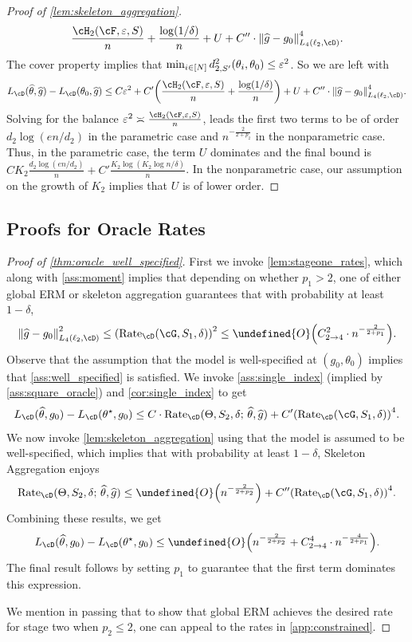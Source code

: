 \documentclass[11pt]{article} %
\newcommand{\pref}[1]{\cref{#1}}
\newcommand{\pfref}[1]{Proof of \pref{#1}}
\theoremstyle{theorem}  %
\theoremstyle{plain}
\DeclarePairedDelimiter{\brk}{[}{]}
\DeclarePairedDelimiter{\prn}{(}{)}
\DeclarePairedDelimiter{\nrm}{\|}{\|}
\newcommand{\ls}{\ell}
\newcommand{\veps}{\varepsilon}
\newcommand{\wt}[1]{\widetilde{#1}}
\newcommand{\wh}[1]{\widehat{#1}}
\let\wt\undefined
\newcommand{\wt}[1]{\widetilde{#1}}
\newcommand{\Ot}{\wt{O}}
\newcommand{\midsem}{;\,}
\newcommand{\poprisk}{L_{\cD}}
\newcommand{\estone}{\wh{g}}
\newcommand{\esttwo}{\wh{\theta}}
\newcommand{\pone}{p_1}
\newcommand{\ptwo}{p_2}
\newcommand{\dtwo}{d_2}
\newcommand{\nuisance}{\cG}
\newcommand{\target}{\Theta}
\newcommand{\dimtwo}{K_2}
\newcommand{\Rate}{\mathrm{Rate}_{\cD}}
\newcommand{\besttwo}{\theta^{\star}}
\newcommand{\gtone}{g_0}
\newcommand{\gttwo}{\theta_0}
\newcommand{\sampleone}{S_1}
\newcommand{\sampletwo}{S_2}
\newcommand{\momentconstant}{C_{2\to{}4}}
\begin{document}
\begin{proof}[\pfref{lem:skeleton_aggregation}]
\begin{align*}
{\frac{\cH_2(\cF,\veps,S)}{n}+ \frac{\log(1/\delta)}{n}
} + U + C''\cdot\nrm*{\estone-\gtone}_{L_4(\ls_2,\cD)}^{4}.
\end{align*}
The cover property implies that $\min_{i\in\brk*{N}}d_{2,S'}^{2}(\theta_i,\gttwo) \leq{} \veps^{2}$. So we are left with
\[
\poprisk(\esttwo,\estone) - \poprisk(\gttwo,\estone) \leq{}C\veps^{2} + C'\prn*{
\frac{\cH_2(\cF,\veps,S)}{n} + \frac{\log(1/\delta)}{n}
} + U + C''\cdot\nrm*{\estone-\gtone}_{L_4(\ls_2,\cD)}^{4}.
\]
%
Solving for the balance $\veps^{2}\asymp\frac{\cH_2(\cF,\veps,S)}{n}$, leads the first two terms to be of order $\dtwo\log(en/\dtwo)$ in the parametric case and $n^{-\frac{2}{2+\ptwo}}$ in the nonparametric case. Thus, in the parametric case, the term $U$ dominates and the final bound is $C\dimtwo{}\frac{\dtwo\log(en/\dtwo)}{n} + C'\frac{\dimtwo\log(\dimtwo\log{}n/\delta)}{n}$. In the nonparametric case, our assumption on the growth of $\dimtwo$ implies that $U$ is of lower order.

\end{proof}

\subsection{Proofs for Oracle Rates}

\begin{proof}[\pfref{thm:oracle_well_specified}]
First we invoke \pref{lem:stageone_rates}, which along with \pref{ass:moment} implies that depending on whether $\pone>2$, one of either global ERM or skeleton aggregation guarantees that with probability at least $1-\delta$,
\[
 \nrm*{\estone-\gtone}_{L_{4}(\ls_2,\cD)}^{2}\leq \prn*{\Rate(\nuisance,\sampleone,\delta)}^{2}
\leq{} \Ot\prn*{
\momentconstant^{2}\cdot{}n^{-\frac{2}{2+\pone}}
}.
\]
Observe that the assumption that the model is well-specified at
$(\gtone,\gttwo)$ implies that \pref{ass:well_specified} is
satisfied. We invoke \pref{ass:single_index} (implied by
\pref{ass:square_oracle}) and \pref{cor:single_index} to get
\[
\poprisk(\esttwo,\gtone) - \poprisk(\besttwo,\gtone) \leq
C\cdot\Rate(\target,\sampletwo,\delta\midsem{}\esttwo,\estone)
+ C'\prn*{\Rate(\nuisance,\sampleone,\delta)}^{4}.
\]
We now invoke \pref{lem:skeleton_aggregation} using that the model is assumed to be well-specified, which implies that with probability at least $1-\delta$, Skeleton Aggregation enjoys
\[
\Rate(\target,\sampletwo,\delta\midsem{}\esttwo,\estone)
\leq{} \Ot\prn*{n^{-\frac{2}{2+\ptwo}}} + C''\prn*{\Rate(\nuisance,\sampleone,\delta)}^{4}.
\]
Combining these results, we get
\[
\poprisk(\esttwo,\gtone) - \poprisk(\besttwo,\gtone) \leq \Ot\prn*{
n^{-\frac{2}{2+\ptwo}} + \momentconstant^{4}\cdot{}n^{-\frac{4}{2+\pone}}
}.
\]
The final result follows by setting $\pone$ to guarantee that the first term dominates this expression.

We mention in passing that to show that global ERM achieves the desired rate for stage two when $\ptwo\leq{}2$, one can appeal to the rates in \pref{app:constrained}.
\end{proof}
\end{document}
